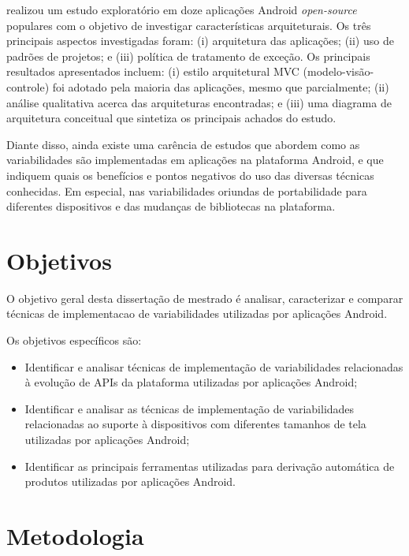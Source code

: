  realizou um estudo exploratório em doze aplicações Android
\textit{open-source}
populares com o objetivo de investigar características arquiteturais. Os três
principais aspectos investigadas foram: (i) arquitetura das aplicações;
(ii) uso de padrões de projetos; e (iii) política de tratamento de exceção.
Os principais resultados apresentados incluem: (i) estilo arquitetural MVC
(modelo-visão-controle) foi adotado pela maioria das aplicações,
mesmo que parcialmente; (ii) análise qualitativa acerca das arquiteturas encontradas;
e (iii) uma diagrama de arquitetura conceitual que sintetiza os principais achados do estudo.

Diante disso, ainda existe uma carência de estudos que abordem como as variabilidades
são implementadas em aplicações na plataforma Android, e que indiquem quais os
benefícios e pontos negativos do uso das diversas técnicas conhecidas. Em especial,
nas variabilidades oriundas de portabilidade para diferentes dispositivos e das
mudanças de bibliotecas na plataforma.

\section{Objetivos}
O objetivo geral desta dissertação de mestrado é analisar, caracterizar e comparar
técnicas de implementacao de variabilidades utilizadas por aplicações Android.

Os objetivos específicos são:
\begin{itemize}
    \item Identificar e analisar técnicas de implementação de variabilidades
        relacionadas à evolução de APIs da plataforma utilizadas por aplicações Android;
    \item Identificar e analisar as técnicas de implementação de variabilidades
        relacionadas ao suporte à dispositivos com diferentes tamanhos de tela utilizadas por aplicações Android;
    \item Identificar as principais ferramentas utilizadas para derivação automática
        de produtos utilizadas por aplicações Android.
\end{itemize}

\section{Metodologia}

